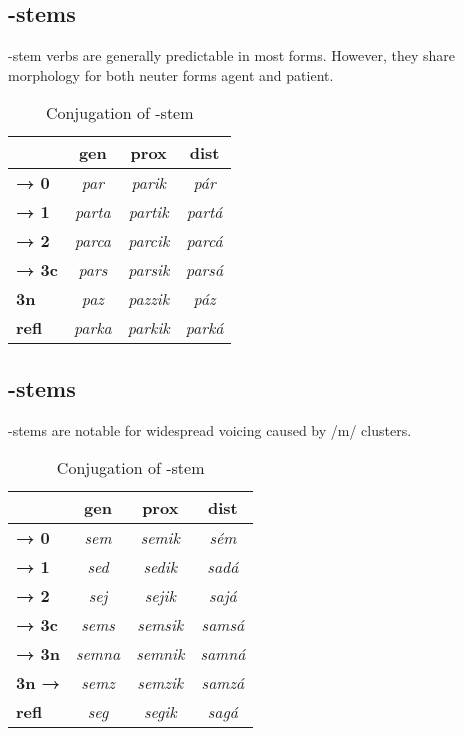 \subsection{-stems}
-stem verbs are generally predictable in most forms. However, they share morphology for both neuter forms agent and patient.

\begin{table}[h] \centering
	\begin{tabular}{l|ccc}
		\toprule
		& \sc\bf gen & \sc\bf prox & \sc\bf dist \\ 
		\midrule
		\sc\bf → 0 & \rzc\it par & \rzc\it parik & \rzc\it pár \\
		\sc\bf → 1 & \rzc\it parta & \rzc\it partik & \rzc\it partá \\
		\sc\bf → 2 & \rzc\it parca & \rzc\it parcik & \rzc\it parcá \\
		\sc\bf → 3c & \rzc\it pars & \rzc\it parsik & \rzc\it parsá \\
		\sc\bf 3n & \rzc\it paz & \rzc\it pazzik & \rzc\it páz \\
		\sc\bf refl & \rzc\it parka & \rzc\it parkik & \rzc\it parká \\
		\bottomrule
	\end{tabular}
	\caption{Conjugation of -stem }
\end{table}

\subsection{-stems}
-stems are notable for widespread voicing caused by /m/ clusters.

\begin{table}[h] \centering
	\begin{tabular}{l|ccc}
		\toprule
		& \sc\bf gen & \sc\bf prox & \sc\bf dist \\ 
		\midrule
		\sc\bf → 0 & \rzc\it sem & \rzc\it semik & \rzc\it sém \\
		\sc\bf → 1 & \rzc\it sed & \rzc\it sedik & \rzc\it sadá \\
		\sc\bf → 2 & \rzc\it sej & \rzc\it sejik & \rzc\it sajá \\
		\sc\bf → 3c & \rzc\it sems & \rzc\it semsik & \rzc\it samsá \\
		\sc\bf → 3n & \rzc\it semna & \rzc\it semnik & \rzc\it samná \\
		\sc\bf 3n → & \rzc\it semz & \rzc\it semzik  & \rzc\it samzá \\
		\sc\bf refl & \rzc\it seg & \rzc\it segik & \rzc\it sagá \\
		\bottomrule
	\end{tabular}
	\caption{Conjugation of -stem }
\end{table}

